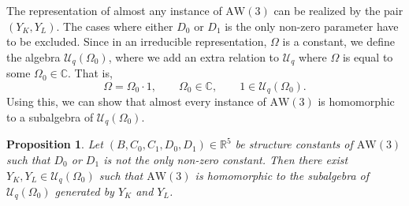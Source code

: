 \documentclass[10pt,a4paper]{amsart}
\numberwithin{equation}{section}
\newtheorem{Proposition}[Theorem]{Proposition}
 { \theoremstyle{definition}
\newtheorem{Definition}[Theorem]{Definition}
\newtheorem{Note}[Theorem]{Note}
\newtheorem{Example}[Theorem]{Example}
\newtheorem{Remark}[Theorem]{Remark} }
\newcommand{\RR}{\mathbb{R}}
\newcommand{\CC}{\mathbb{C}}
\newcommand{\aw}{\mathrm{AW}\!\left(3\right)}
\newcommand{\Uq}{\mathcal{U}_q}
\newcommand{\UqO}[1][q]{\mathcal{U}_{#1}\left(\Omega_0\right)}
\begin{document}
The representation of almost any instance of $\aw$ can be realized by the pair $(Y_K,Y_L)$. The cases where either $D_0$ or $D_1$ is the only non-zero parameter have to be excluded.
Since in an irreducible representation, $\Omega$ is a constant, we define the algebra $\UqO$, where we add an extra relation to $\Uq$ where $\Omega$ is equal to some $\Omega_0\in\CC$. That is,
\[
\Omega = \Omega_0 \cdot 1, \qquad \Omega_0\in\CC,\qquad 1\in\UqO.
\]
Using this, we can show that almost every instance of $\aw$ is homomorphic to a subalgebra of $\UqO$.
\begin{Proposition}\label{thm:awisouq}
	Let $(B,C_0,C_1,D_0,D_1)\in\RR^5$ be structure constants of $\aw$ such that $D_0$ or $D_1$ is not the only non-zero constant. Then there exist $ Y_K,Y_L\in\UqO$ such that $\aw$ is homomorphic to the subalgebra of $\UqO$ generated by $Y_K$ and $Y_L$.
\end{Proposition}
\end{document}
